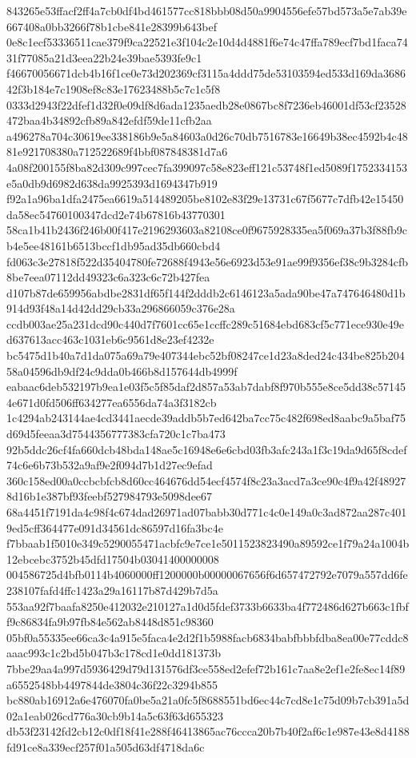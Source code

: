 \documentclass[11pt,a4paper]{article}
\begin{document}
{843265e53ffacf2ff4a7cb0df4bd461577cc818bbb08d50a9904556efe57bd573a5e7ab39e667408a0bb3266f78b1cbe841e28399b643bef
0e8c1ecf53336511cae379f9ca22521e3f104c2e10d4d4881f6e74c47ffa789ecf7bd1faca7431f77085a21d3eea22b24e39bae5393fe9c1
f46670056671dcb4b16f1ce0e73d202369cf3115a4ddd75de53103594ed533d169da368642f3b184e7c1908ef8c83e17623488b5c7c1c5f8
0333d2943f22dfef1d32f0e09df8d6ada1235aedb28e0867bc8f7236eb46001df53cf23528472baa4b34892cfb89a842efdf59de11cfb2aa
a496278a704c30619ee338186b9e5a84603a0d26c70db7516783e16649b38ec4592b4c4881e921708380a712522689f4bbf087848381d7a6
4a08f200155f8ba82d309c997cec7fa399097c58e823eff121c53748f1ed5089f1752334153e5a0db9d6982d638da9925393d1694347b919
f92a1a96ba1dfa2475ea6619a514489205be8102e83f29e13731c67f5677c7dfb42e15450da58ec54760100347dcd2e74b67816b43770301
58ca1b41b2436f246b00f417e2196293603a82108ce0f9675928335ea5f069a37b3f88fb9cb4e5ee48161b6513bccf1db95ad35db660cbd4
fd063c3e27818f522d35404780fe72688f4943e56e6923d53e91ae99f9356ef38c9b3284cfb8be7eea07112dd49323c6a323c6c72b427fea
d107b87de659956abdbe2831df65f144f2dddb2c6146123a5ada90be47a747646480d1b914d93f48a14d42dd29cb33a296866059c376e28a
ccdb003ae25a231dcd90c440d7f7601cc65e1ccffc289c51684ebd683cf5c771ece930e49ed637613acc463c1031eb6c9561d8e23ef4232e
bc5475d1b40a7d1da075a69a79e407344ebc52bf08247ce1d23a8ded24c434be825b20458a04596db9df24c9dda0b466b8d157644db4999f
eabaac6deb532197b9ea1e03f5c5f85daf2d857a53ab7dabf8f970b555e8ce5dd38c571454e671d0fd506ff634277ea6556da74a3f3182cb
1c4294ab243144ae4cd3441aecde39addb5b7ed642ba7cc75c482f698ed8aabc9a5baf75d69d5feeaa3d7544356777383cfa720c1c7ba473
92b5ddc26cf4fa660dcb48bda148ae5c16948e6e6cbd03fb3afc243a1f3c19da9d65f8cdef74c6e6b73b532a9af9e2f094d7b1d27ec9efad
360c158ed00a0ccbcbfcb8d60cc464676dd54ecf4574f8c23a3acd7a3ce90c4f9a42f489278d16b1e387bf93feebf527984793e5098dee67
68a4451f7191da4c98f4c674dad26971ad07babb30d771c4c0e149a0c3ad872aa287c4019ed5cff364477e091d34561dc86597d16fa3bc4e
f7bbaab1f5010e349c5290055471acbfc9e7ce1e5011523823490a89592ce1f79a24a1004b12ebcebc3752b45dfd17504b03041400000008
004586725d4bfb0114b4060000ff1200000b00000067656f6d657472792e7079a557dd6fe238107fafd4ffc1423a29a16117b87d429b7d5a
553aa92f7baafa8250e412032e210127a1d0d5fdef3733b6633ba4f772486d627b663c1fbff9c86834fa9b97fb84e562ab8448d851c98360
05bf0a55335ee66ca3c4a915e5faca4e2d2f1b5988facb6834babfbbbfdba8ea00e77cddc8aaac993c1c2bd5b047b3c178cd1e0dd181373b
7bbe29aa4a997d5936429d79d131576df3ce558ed2efef72b161c7aa8e2ef1e2fe8ec14f89a6552548bb4497844de3804c36f22c3294b855
bc880ab16912a6e476070fa0be5a21a0fc5f8688551bd6ec44c7cd8e1c75d09b7cb391a5d02a1eab026cd776a30cb9b14a5c63f63d655323
db53f23142fd2cb12c0df18f41e288f46413865ac76ccca20b7b40f2af6c1e987e43e8d4188fd91ce8a339ecf257f01a505d63df4718da6c
}
\end{document}
